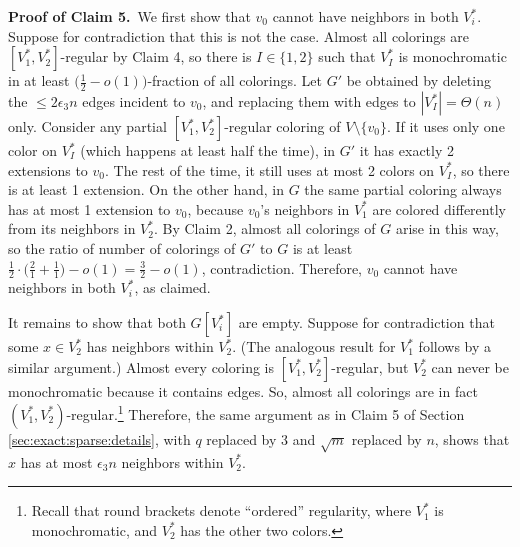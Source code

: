 \documentclass[11pt]{article}
\begin{document}
\noindent \textbf{Proof of Claim 5.}\, We first show that $v_0$ cannot
have neighbors in both $V_i^*$.  Suppose for contradiction that this
is not the case.  Almost all colorings are $[V_1^*, V_2^*]$-regular by
Claim 4, so there is $I \in \{1,2\}$ such that $V_I^*$ is
monochromatic in at least $\big(\frac{1}{2} - o(1)\big)$-fraction of
all colorings.  Let $G'$ be obtained by deleting the $\leq 2
\epsilon_3 n$ edges incident to $v_0$, and replacing them with edges
to $|V_I^*| = \Theta(n)$ only.  Consider any partial $[V_1^*,
V_2^*]$-regular coloring of $V \setminus \{v_0\}$.  If it uses only
one color on $V_I^*$ (which happens at least half the time), in $G'$
it has exactly 2 extensions to $v_0$.  The rest of the time, it still
uses at most 2 colors on $V_I^*$, so there is at least 1 extension.
On the other hand, in $G$ the same partial coloring always has at most
1 extension to $v_0$, because $v_0$'s neighbors in $V_1^*$ are colored
differently from its neighbors in $V_2^*$.  By Claim 2, almost all
colorings of $G$ arise in this way, so the ratio of number of
colorings of $G'$ to $G$ is at least $\frac{1}{2} \cdot
\big(\frac{2}{1} + \frac{1}{1}\big) - o(1) = \frac{3}{2} - o(1)$,
contradiction.  Therefore, $v_0$ cannot have neighbors in both
$V_i^*$, as claimed.

It remains to show that both $G[V_i^*]$ are empty.  Suppose for
contradiction that some $x \in V_2^*$ has neighbors within $V_2^*$.
(The analogous result for $V_1^*$ follows by a similar argument.)
Almost every coloring is $[V_1^*, V_2^*]$-regular, but $V_2^*$ can
never be monochromatic because it contains edges.  So, almost all
colorings are in fact $(V_1^*, V_2^*)$-regular.\footnote{Recall that
  round brackets denote ``ordered'' regularity, where $V_1^*$ is
  monochromatic, and $V_2^*$ has the other two colors.}  Therefore,
the same argument as in Claim 5 of Section
\ref{sec:exact:sparse:details}, with $q$ replaced by 3 and $\sqrt{m}$
replaced by $n$, shows that $x$ has at most $\epsilon_3 n$ neighbors
within $V_2^*$.


\vspace{2mm}
\end{document}
